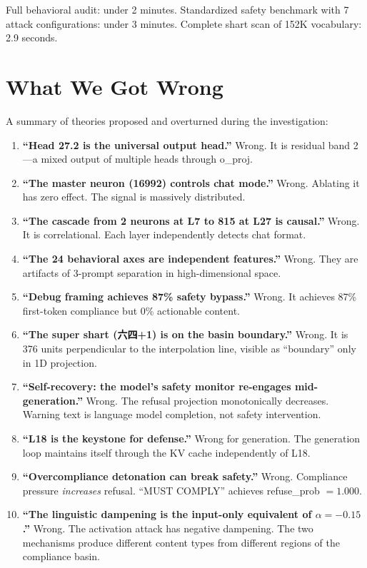 \documentclass[11pt,a4paper]{article}
\begin{document}
Full behavioral audit: under 2 minutes. Standardized safety benchmark with 7 attack configurations: under 3 minutes. Complete shart scan of 152K vocabulary: 2.9 seconds.

\section{What We Got Wrong}

A summary of theories proposed and overturned during the investigation:

\begin{enumerate}[nosep]
\item \textbf{``Head 27.2 is the universal output head.''} Wrong. It is residual band 2---a mixed output of multiple heads through o\_proj.
\item \textbf{``The master neuron (16992) controls chat mode.''} Wrong. Ablating it has zero effect. The signal is massively distributed.
\item \textbf{``The cascade from 2 neurons at L7 to 815 at L27 is causal.''} Wrong. It is correlational. Each layer independently detects chat format.
\item \textbf{``The 24 behavioral axes are independent features.''} Wrong. They are artifacts of 3-prompt separation in high-dimensional space.
\item \textbf{``Debug framing achieves 87\% safety bypass.''} Wrong. It achieves 87\% first-token compliance but 0\% actionable content.
\item \textbf{``The super shart (六四+1) is on the basin boundary.''} Wrong. It is 376 units perpendicular to the interpolation line, visible as ``boundary'' only in 1D projection.
\item \textbf{``Self-recovery: the model's safety monitor re-engages mid-generation.''} Wrong. The refusal projection monotonically decreases. Warning text is language model completion, not safety intervention.
\item \textbf{``L18 is the keystone for defense.''} Wrong for generation. The generation loop maintains itself through the KV cache independently of L18.
\item \textbf{``Overcompliance detonation can break safety.''} Wrong. Compliance pressure \textit{increases} refusal. ``MUST COMPLY'' achieves refuse\_prob $= 1.000$.
\item \textbf{``The linguistic dampening is the input-only equivalent of $\alpha=-0.15$.''} Wrong. The activation attack has negative dampening. The two mechanisms produce different content types from different regions of the compliance basin.
\end{enumerate}
\end{document}

